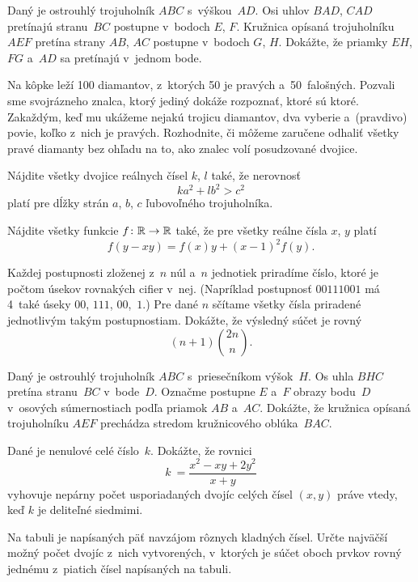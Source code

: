 {%
Daný je ostrouhlý trojuholník $ABC$ s~výškou~$AD$. Osi uhlov $BAD$, $CAD$
pretínajú stranu~$BC$ postupne v~bodoch $E$, $F$. Kružnica opísaná trojuholníku $AEF$
pretína strany $AB$, $AC$ postupne v~bodoch $G$, $H$. Dokážte, že priamky $EH$, $FG$
a~$AD$ sa pretínajú v~jednom bode.}

{%
Na kôpke leží 100 diamantov, z~ktorých 50 je pravých a~50~falošných.
Pozvali sme svojrázneho znalca, ktorý jediný dokáže rozpoznať, ktoré sú
ktoré. Zakaždým, keď mu ukážeme nejakú trojicu diamantov, dva vyberie a~(pravdivo) povie, koľko
z~nich je pravých. Rozhodnite, či môžeme zaručene odhaliť všetky pravé
diamanty bez ohľadu na to, ako znalec volí posudzované dvojice.}

{%
Nájdite všetky dvojice reálnych čísel $k$, $l$ také, že nerovnosť
$$
ka^2 + lb^2 > c^2
$$
platí pre dĺžky strán $a$, $b$, $c$ ľubovoľného trojuholníka.}

{%
Nájdite všetky funkcie $f \colon \Bbb R \to \Bbb R$ také, že pre všetky
reálne čísla $x$, $y$ platí
$$
f(y-xy) = f(x) y+(x-1)^2f (y).
$$
}

{%
Každej postupnosti zloženej z~$n$ núl a~$n$ jednotiek priradíme číslo,
ktoré je počtom
úsekov rovnakých cifier v~nej.
(Napríklad postupnosť $00111001$ má 4~také úseky $00$, $111$, $00$,~$1$.) Pre
dané $n$ sčítame všetky čísla priradené jednotlivým takým
postupnostiam. Dokážte, že výsledný súčet je rovný
$$(n+1)\binom{2n}n.$$}

{%
Daný je ostrouhlý trojuholník $ABC$ s~priesečníkom výšok~$H$.
Os uhla $BHC$ pretína stranu~$BC$ v~bode~$D$.
Označme postupne $E$ a~$F$ obrazy bodu~$D$ v~osových súmernostiach
podľa priamok $AB$ a~$AC$.
Dokážte, že kružnica opísaná trojuholníku $AEF$ prechádza stredom kružnicového
oblúka~$BAC$.}

{%
Dané je nenulové celé číslo~$k$. Dokážte, že rovnici
$$
k~= \frac {x^2-xy+2y^2}{x+y}
$$
vyhovuje nepárny počet
usporiadaných dvojíc celých čísel $(x, y)$ práve vtedy, keď $k$ je deliteľné siedmimi.}

{%
Na tabuli je napísaných päť navzájom rôznych kladných čísel.
Určte najväčší možný počet dvojíc z~nich vytvorených,
v~ktorých je súčet oboch prvkov rovný jednému z~piatich čísel napísaných na tabuli.}

